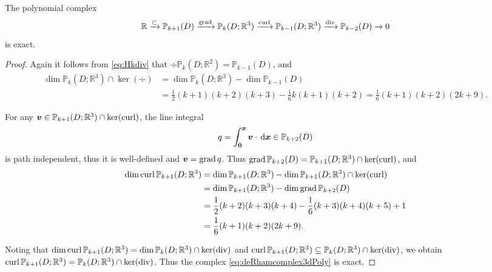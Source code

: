 \begin{lemma}
The polynomial complex
\begin{equation}\label{eq:deRhamcomplex3dPoly}
\mathbb R\xrightarrow{\subset} \mathbb P_{k+1}(D)\xrightarrow{\operatorname{grad}} \mathbb P_{k}(D;\mathbb R^3)\xrightarrow{\operatorname{curl}}\mathbb P_{k-1}(D;\mathbb R^3) \xrightarrow{\operatorname{div}} \mathbb P_{k-2}(D)\xrightarrow{}0
\end{equation}
is exact.
\end{lemma}
\begin{proof}
Again it follows from \eqref{eq:Hkdiv} that $\div\mathbb P_k(D;\mathbb R^2) = \mathbb P_{k-1}(D)$, and
\begin{align*}
\dim\mathbb P_k(D;\mathbb R^3)\cap\ker(\div)&=\dim \mathbb P_k(D; \mathbb R^3)-\dim \mathbb P_{k-1}(D) \\
&=\frac{1}{2}(k+1)(k+2)(k+3)-\frac{1}{6}k(k+1)(k+2)=\frac{1}{6}(k+1)(k+2)(2k+9).
\end{align*}

For any $\boldsymbol v\in\mathbb P_{k+1}(D; \mathbb R^3)\cap\ker(\operatorname{curl})$, the line integral
\[
q=\int_{\boldsymbol 0}^{\boldsymbol x}\boldsymbol v\cdot\,{\rm d}\boldsymbol x \in \mathbb P_{k+2}(D)
\]
is path independent, thus it is well-defined and $\boldsymbol v=\operatorname{grad} q$. Thus $\operatorname{grad}\mathbb P_{k+2}(D)=\mathbb P_{k+1}(D; \mathbb R^3)\cap\ker(\operatorname{curl})$, and
\begin{align*}
\dim\operatorname{curl}\mathbb P_{k+1}(D; \mathbb R^3)&=\dim \mathbb P_{k+1}(D; \mathbb R^3)-\dim \mathbb P_{k+1}(D; \mathbb R^3)\cap\ker(\operatorname{curl}) \\
&=\dim \mathbb P_{k+1}(D; \mathbb R^3)-\dim\operatorname{grad}\mathbb P_{k+2}(D) \\
&=\frac{1}{2}(k+2)(k+3)(k+4)-\frac{1}{6}(k+3)(k+4)(k+5)+1 \\
&=\frac{1}{6}(k+1)(k+2)(2k+9).
\end{align*}

Noting that $\dim\operatorname{curl}\mathbb P_{k+1}(D; \mathbb R^3)=\dim\mathbb P_k(D;\mathbb R^3)\cap\ker(\operatorname{div})$ and $\operatorname{curl}\mathbb P_{k+1}(D; \mathbb R^3)\subseteq\mathbb P_k(D;\mathbb R^3)\cap\ker(\operatorname{div})$, we obtain $\operatorname{curl}\mathbb P_{k+1}(D; \mathbb R^3)=\mathbb P_k(D;\mathbb R^3)\cap\ker(\operatorname{div})$.
Thus the complex \eqref{eq:deRhamcomplex3dPoly} is exact.
\end{proof}

%




